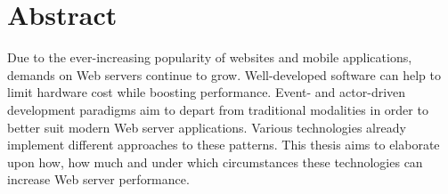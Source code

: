 \chapter{Abstract}

Due to the ever-increasing popularity of websites and mobile applications, demands on Web servers continue to grow. Well-developed software can help to limit hardware cost while boosting performance. Event- and actor-driven development paradigms aim to depart from traditional modalities in order to better suit modern Web server applications. Various technologies already implement different approaches to these patterns. This thesis aims to elaborate upon how, how much and under which circumstances these technologies can increase Web server performance.

